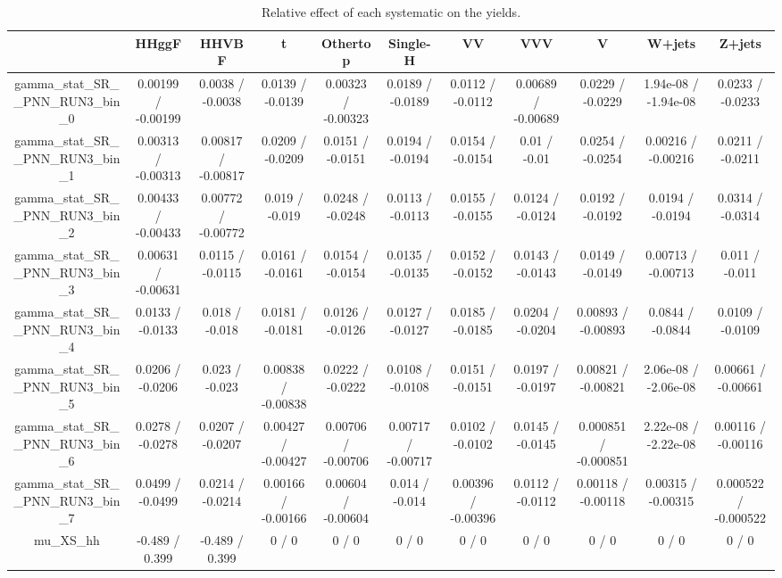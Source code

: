 \documentclass[10pt]{article}
\begin{document}
\begin{table}[htbp]
\begin{center}
\begin{tabular}{|c|c|c|c|c|c|c|c|c|c|c|}
\hline 
      & HHggF      & HHVBF      & t      & Othertop      & Single-H      & VV      & VVV      & V      & W+jets      & Z+jets \\ 
\hline 
  gamma_stat_SR__PNN_RUN3_bin_0 & 0.00199 / -0.00199 & 0.0038 / -0.0038 & 0.0139 / -0.0139 & 0.00323 / -0.00323 & 0.0189 / -0.0189 & 0.0112 / -0.0112 & 0.00689 / -0.00689 & 0.0229 / -0.0229 & 1.94e-08 / -1.94e-08 & 0.0233 / -0.0233 \\ 
  gamma_stat_SR__PNN_RUN3_bin_1 & 0.00313 / -0.00313 & 0.00817 / -0.00817 & 0.0209 / -0.0209 & 0.0151 / -0.0151 & 0.0194 / -0.0194 & 0.0154 / -0.0154 & 0.01 / -0.01 & 0.0254 / -0.0254 & 0.00216 / -0.00216 & 0.0211 / -0.0211 \\ 
  gamma_stat_SR__PNN_RUN3_bin_2 & 0.00433 / -0.00433 & 0.00772 / -0.00772 & 0.019 / -0.019 & 0.0248 / -0.0248 & 0.0113 / -0.0113 & 0.0155 / -0.0155 & 0.0124 / -0.0124 & 0.0192 / -0.0192 & 0.0194 / -0.0194 & 0.0314 / -0.0314 \\ 
  gamma_stat_SR__PNN_RUN3_bin_3 & 0.00631 / -0.00631 & 0.0115 / -0.0115 & 0.0161 / -0.0161 & 0.0154 / -0.0154 & 0.0135 / -0.0135 & 0.0152 / -0.0152 & 0.0143 / -0.0143 & 0.0149 / -0.0149 & 0.00713 / -0.00713 & 0.011 / -0.011 \\ 
  gamma_stat_SR__PNN_RUN3_bin_4 & 0.0133 / -0.0133 & 0.018 / -0.018 & 0.0181 / -0.0181 & 0.0126 / -0.0126 & 0.0127 / -0.0127 & 0.0185 / -0.0185 & 0.0204 / -0.0204 & 0.00893 / -0.00893 & 0.0844 / -0.0844 & 0.0109 / -0.0109 \\ 
  gamma_stat_SR__PNN_RUN3_bin_5 & 0.0206 / -0.0206 & 0.023 / -0.023 & 0.00838 / -0.00838 & 0.0222 / -0.0222 & 0.0108 / -0.0108 & 0.0151 / -0.0151 & 0.0197 / -0.0197 & 0.00821 / -0.00821 & 2.06e-08 / -2.06e-08 & 0.00661 / -0.00661 \\ 
  gamma_stat_SR__PNN_RUN3_bin_6 & 0.0278 / -0.0278 & 0.0207 / -0.0207 & 0.00427 / -0.00427 & 0.00706 / -0.00706 & 0.00717 / -0.00717 & 0.0102 / -0.0102 & 0.0145 / -0.0145 & 0.000851 / -0.000851 & 2.22e-08 / -2.22e-08 & 0.00116 / -0.00116 \\ 
  gamma_stat_SR__PNN_RUN3_bin_7 & 0.0499 / -0.0499 & 0.0214 / -0.0214 & 0.00166 / -0.00166 & 0.00604 / -0.00604 & 0.014 / -0.014 & 0.00396 / -0.00396 & 0.0112 / -0.0112 & 0.00118 / -0.00118 & 0.00315 / -0.00315 & 0.000522 / -0.000522 \\ 
  mu_XS_hh & -0.489 / 0.399 & -0.489 / 0.399 & 0 / 0 & 0 / 0 & 0 / 0 & 0 / 0 & 0 / 0 & 0 / 0 & 0 / 0 & 0 / 0 \\ 
\hline 
\end{tabular} 
\caption{Relative effect of each systematic on the yields.} 
\end{center} 
\end{table} 
\end{document}
